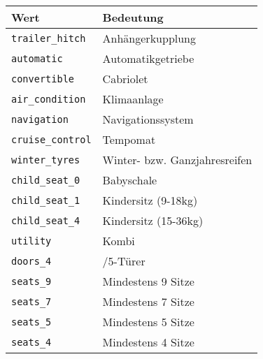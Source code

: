\begin{flushleft}
\begin{tabularx}{\linewidth}{l>{\raggedright\arraybackslash}X} 
\toprule
Wert & Bedeutung\\
\midrule
\verb|trailer_hitch| & Anhängerkupplung\\
\verb|automatic| & Automatikgetriebe\\
\verb|convertible| & Cabriolet\\
\verb|air_condition| & Klimaanlage\\
\verb|navigation| & Navigationssystem\\
\verb|cruise_control| & Tempomat\\
\verb|winter_tyres| & Winter- bzw. Ganzjahresreifen\\
\verb|child_seat_0| & Babyschale\\
\verb|child_seat_1| & Kindersitz (9-18kg)\\
\verb|child_seat_4| & Kindersitz (15-36kg)\\
\verb|utility| & Kombi\\
\verb|doors_4| & 4/5-Türer\\
\verb|seats_9| & Mindestens 9 Sitze\\
\verb|seats_7| & Mindestens 7 Sitze\\
\verb|seats_5| & Mindestens 5 Sitze\\
\verb|seats_4| & Mindestens 4 Sitze\\
\bottomrule
\end{tabularx}
\end{flushleft}

